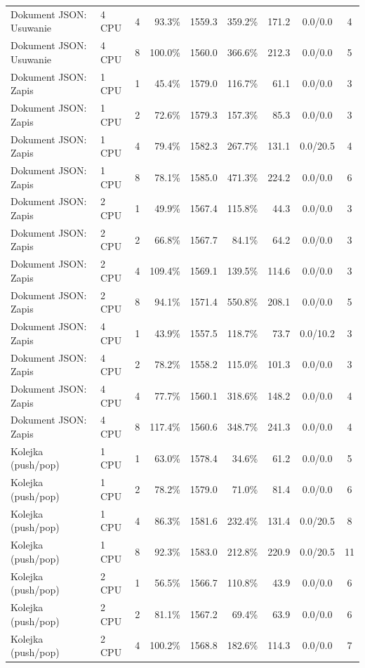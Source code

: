 \begin{table}[ht]
{\begin{tabular}{llcrrrrcc}
Dokument JSON: Usuwanie & 4 CPU & 4 & 93.3\% & 1559.3 & 359.2\% & 171.2 & 0.0/0.0 & 4 \\
Dokument JSON: Usuwanie & 4 CPU & 8 & 100.0\% & 1560.0 & 366.6\% & 212.3 & 0.0/0.0 & 5 \\
Dokument JSON: Zapis & 1 CPU & 1 & 45.4\% & 1579.0 & 116.7\% & 61.1 & 0.0/0.0 & 3 \\
Dokument JSON: Zapis & 1 CPU & 2 & 72.6\% & 1579.3 & 157.3\% & 85.3 & 0.0/0.0 & 3 \\
Dokument JSON: Zapis & 1 CPU & 4 & 79.4\% & 1582.3 & 267.7\% & 131.1 & 0.0/20.5 & 4 \\
Dokument JSON: Zapis & 1 CPU & 8 & 78.1\% & 1585.0 & 471.3\% & 224.2 & 0.0/0.0 & 6 \\
Dokument JSON: Zapis & 2 CPU & 1 & 49.9\% & 1567.4 & 115.8\% & 44.3 & 0.0/0.0 & 3 \\
Dokument JSON: Zapis & 2 CPU & 2 & 66.8\% & 1567.7 & 84.1\% & 64.2 & 0.0/0.0 & 3 \\
Dokument JSON: Zapis & 2 CPU & 4 & 109.4\% & 1569.1 & 139.5\% & 114.6 & 0.0/0.0 & 3 \\
Dokument JSON: Zapis & 2 CPU & 8 & 94.1\% & 1571.4 & 550.8\% & 208.1 & 0.0/0.0 & 5 \\
Dokument JSON: Zapis & 4 CPU & 1 & 43.9\% & 1557.5 & 118.7\% & 73.7 & 0.0/10.2 & 3 \\
Dokument JSON: Zapis & 4 CPU & 2 & 78.2\% & 1558.2 & 115.0\% & 101.3 & 0.0/0.0 & 3 \\
Dokument JSON: Zapis & 4 CPU & 4 & 77.7\% & 1560.1 & 318.6\% & 148.2 & 0.0/0.0 & 4 \\
Dokument JSON: Zapis & 4 CPU & 8 & 117.4\% & 1560.6 & 348.7\% & 241.3 & 0.0/0.0 & 4 \\
Kolejka (push/pop) & 1 CPU & 1 & 63.0\% & 1578.4 & 34.6\% & 61.2 & 0.0/0.0 & 5 \\
Kolejka (push/pop) & 1 CPU & 2 & 78.2\% & 1579.0 & 71.0\% & 81.4 & 0.0/0.0 & 6 \\
Kolejka (push/pop) & 1 CPU & 4 & 86.3\% & 1581.6 & 232.4\% & 131.4 & 0.0/20.5 & 8 \\
Kolejka (push/pop) & 1 CPU & 8 & 92.3\% & 1583.0 & 212.8\% & 220.9 & 0.0/20.5 & 11 \\
Kolejka (push/pop) & 2 CPU & 1 & 56.5\% & 1566.7 & 110.8\% & 43.9 & 0.0/0.0 & 6 \\
Kolejka (push/pop) & 2 CPU & 2 & 81.1\% & 1567.2 & 69.4\% & 63.9 & 0.0/0.0 & 6 \\
Kolejka (push/pop) & 2 CPU & 4 & 100.2\% & 1568.8 & 182.6\% & 114.3 & 0.0/0.0 & 7 \\

\end{tabular}}
\end{table}
